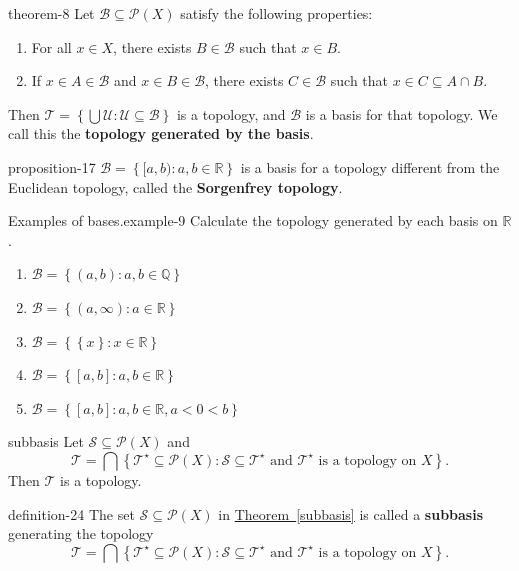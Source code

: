\documentclass[10pt,]{article}
\newcommand{\terminology}[1]{\textbf{#1}}
\newcommand{\mb}{\mathbb}
\newcommand{\mc}{\mathcal}
\newcommand{\setBuilder}[2]{\left\{#1:#2\right\}}
\newcommand{\setList}[1]{\left\{#1\right\}}
\newcommand{\lt}{<}
\begin{document}
\begin{theorem}{}{}{theorem-8}%
\hypertarget{p-75}{}%
Let \(\mc B\subseteq\mc P(X)\) satisfy the following properties:%
\leavevmode%
\begin{enumerate}
\item\hypertarget{li-59}{}For all \(x\in X\), there exists \(B\in\mc B\) such that \(x\in B\).%
\item\hypertarget{li-60}{}If \(x\in A\in\mc B\) and \(x\in B\in\mc B\), there exists \(C\in\mc B\) such that \(x\in C\subseteq A\cap B\).%
\end{enumerate}
\hypertarget{p-76}{}%
Then \(\mc T=\setBuilder{\bigcup\mc U}{\mc U\subseteq\mc B}\) is a topology, and \(\mc B\) is a basis for that topology. We call this the \terminology{topology generated by the basis}.%
\end{theorem}
\begin{proposition}{}{}{proposition-17}%
\hypertarget{p-77}{}%
\(\mc B=\setBuilder{[a,b)}{a,b\in\mb R}\) is a basis for a topology different from the Euclidean topology, called the \terminology{Sorgenfrey topology}.%
\end{proposition}
\begin{example}{Examples of bases.}{example-9}%
\hypertarget{p-78}{}%
Calculate the topology generated by each basis on \(\mb R\).%
\leavevmode%
\begin{enumerate}
\item\hypertarget{li-61}{}\(\mc B=\setBuilder{(a,b)}{a,b\in\mb Q}\)%
\item\hypertarget{li-62}{}\(\mc B=\setBuilder{(a,\infty)}{a\in\mb R}\)%
\item\hypertarget{li-63}{}\(\mc B=\setBuilder{\setList{x}}{x\in\mb R}\)%
\item\hypertarget{li-64}{}\(\mc B=\setBuilder{[a,b]}{a,b\in\mb R}\)%
\item\hypertarget{li-65}{}\(\mc B=\setBuilder{[a,b]}{a,b\in\mb R,a\lt0\lt b}\)%
\end{enumerate}
\end{example}
\begin{theorem}{}{}{subbasis}%
\hypertarget{p-79}{}%
Let \(\mc S\subseteq\mc P(X)\) and%
\begin{equation*}
\mc T=\bigcap\setBuilder{\mc T^\star\subseteq\mc P(X)}{\mc S\subseteq\mc T^\star \text{ and }
\mc T^\star \text{ is a topology on } X}.
\end{equation*}
Then \(\mc T\) is a topology.%
\end{theorem}
\begin{definition}{}{definition-24}%
\hypertarget{p-80}{}%
The set \(\mc S\subseteq\mc P(X)\) in \hyperref[subbasis]{Theorem~\ref{subbasis}} is called a \terminology{subbasis} generating the topology%
\begin{equation*}
\mc T=\bigcap\setBuilder{\mc T^\star\subseteq\mc P(X)}{\mc S\subseteq\mc T^\star \text{ and }
\mc T^\star \text{ is a topology on } X}.
\end{equation*}
%
\end{definition}
\end{document}

